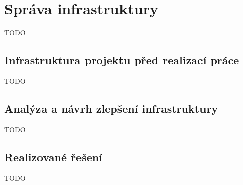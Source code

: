 \chapter{Správa infrastruktury}

TODO

\section{Infrastruktura projektu před realizací práce}

TODO

\section{Analýza a návrh zlepšení infrastruktury}

TODO

\section{Realizované řešení}

TODO
